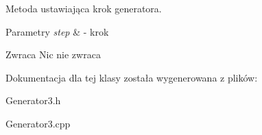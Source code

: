 Metoda ustawiająca krok generatora. 


\begin{DoxyParams}{Parametry}
{\em step} & -\/ krok \\
\hline
\end{DoxyParams}
\begin{DoxyReturn}{Zwraca}
Nic nie zwraca 
\end{DoxyReturn}


Dokumentacja dla tej klasy została wygenerowana z plików\+:\begin{DoxyCompactItemize}
\item 
Generator3.\+h\item 
Generator3.\+cpp\end{DoxyCompactItemize}
